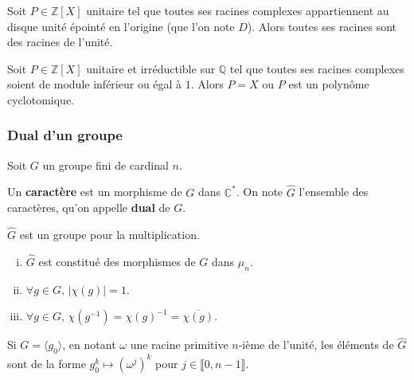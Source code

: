	
	\begin{theorem}[Kronecker]
		Soit $P \in \mathbb{Z}[X]$ unitaire tel que toutes ses racines complexes appartiennent au disque unité épointé en l'origine (que l'on note $D$). Alors toutes ses racines sont des racines de l'unité.
	\end{theorem}
	
	\begin{corollary}
		Soit $P \in \mathbb{Z}[X]$ unitaire et irréductible sur $\mathbb{Q}$ tel que toutes ses racines complexes soient de module inférieur ou égal à $1$. Alors $P = X$ ou $P$ est un polynôme cyclotomique.
	\end{corollary}
	
	\subsubsection{Dual d'un groupe}
	
	Soit $G$ un groupe fini de cardinal $n$.
	
	
	\begin{definition}
		Un \textbf{caractère} est un morphisme de $G$ dans $\mathbb{C}^*$. On note $\widehat{G}$ l'ensemble des caractères, qu'on appelle \textbf{dual} de $G$. 
	\end{definition}
	
	\begin{proposition}
		$\widehat{G}$ est un groupe pour la multiplication.
	\end{proposition}
	
	\begin{proposition}
		\begin{enumerate}[(i)]
			\item $\widehat{G}$ est constitué des morphismes de $G$ dans $\mu_n$.
			\item $\forall g \in G$, $\vert \chi(g) \vert = 1$.
			\item $\forall g \in G$, $\chi(g^{-1}) = \chi(g)^{-1} = \overline{\chi(g)}$.
		\end{enumerate}
	\end{proposition}
	
	\begin{proposition}
		Si $G = \langle g_0 \rangle$, en notant $\omega$ une racine primitive $n$-ième de l'unité, les éléments de $\widehat{G}$ sont de la forme $g_0^k \mapsto (\omega^j)^k$ pour $j \in \llbracket 0, n-1 \rrbracket$.
	\end{proposition}
	

